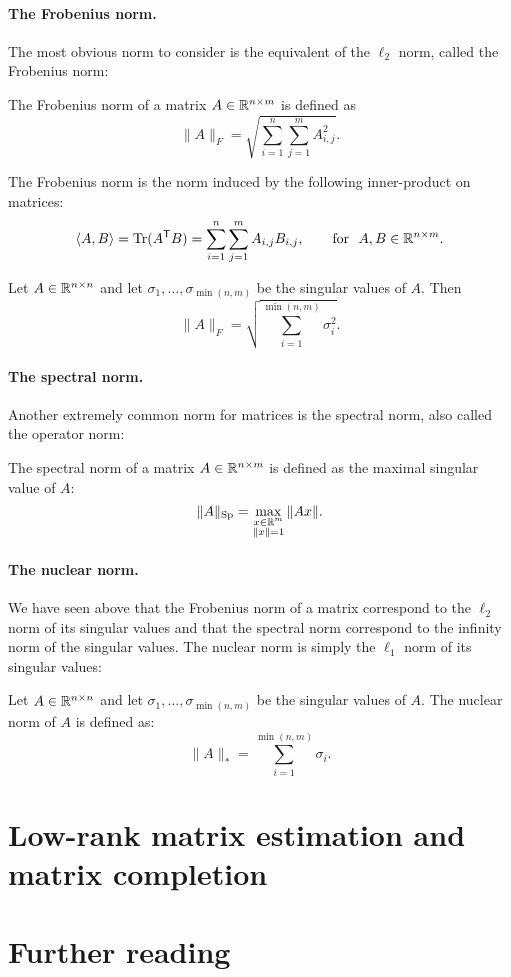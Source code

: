 \documentclass[11pt,nocut]{article}
\begin{document}
\paragraph{The Frobenius norm.} The most obvious norm to consider is the equivalent of the $\ell_2$ norm, called the Frobenius norm:
\begin{definition}
	The Frobenius norm of a matrix $A \in \mathbb{R}^{n \times m}$ is defined as
	$$
	\|A\|_F = \sqrt{\sum_{i=1}^n \sum_{j=1}^m A_{i,j}^2}. 
	$$
\end{definition}

\begin{remark}
	The Frobenius norm is the norm induced by the following inner-product on matrices:
	$$
	\langle A,B \rangle = {{\rm Tr}}(A^{{\sf T}}B) = \sum_{i=1}^n\sum_{j=1}^m A_{i,j} B_{i,j}, \qquad \text{for} \ \ A,B \in \mathbb{R}^{n \times m}.
	$$
\end{remark}

\begin{proposition}
	Let $A \in \mathbb{R}^{n \times n}$ and let $\sigma_1, \dots, \sigma_{\min(n,m)}$ be the singular values of $A$. Then
	$$
	\|A\|_F = \sqrt{\sum_{i=1}^{\min(n,m)} \sigma_i^2}.
	$$
\end{proposition}

\paragraph{The spectral norm.} Another extremely common norm for matrices is the spectral norm, also called the operator norm:

\begin{definition}
	The spectral norm of a matrix $A \in \mathbb{R}^{n \times m}$ is defined as the maximal singular value of $A$:
	$$
	\|A\|_{\rm Sp} = \max_{\substack{x \in \mathbb{R}^m \\ \|x\|=1}} \|Ax\|.
	$$
\end{definition}

\paragraph{The nuclear norm.} We have seen above that the Frobenius norm of a matrix correspond to the $\ell_2$ norm of its singular values and that the spectral norm correspond to the infinity norm of the singular values. The nuclear norm is simply the $\ell_1$ norm of its singular values:
\begin{definition}
	Let $A \in \mathbb{R}^{n \times n}$ and let $\sigma_1, \dots, \sigma_{\min(n,m)}$ be the singular values of $A$. The nuclear norm of $A$ is defined as:
	$$
	\|A\|_* = \sum_{i=1}^{\min(n,m)} \sigma_i.
	$$
	
\end{definition}

\section{Low-rank matrix estimation and matrix completion}



\section*{Further reading}


\vspace{1cm}
\centerline{}




\end{document}
